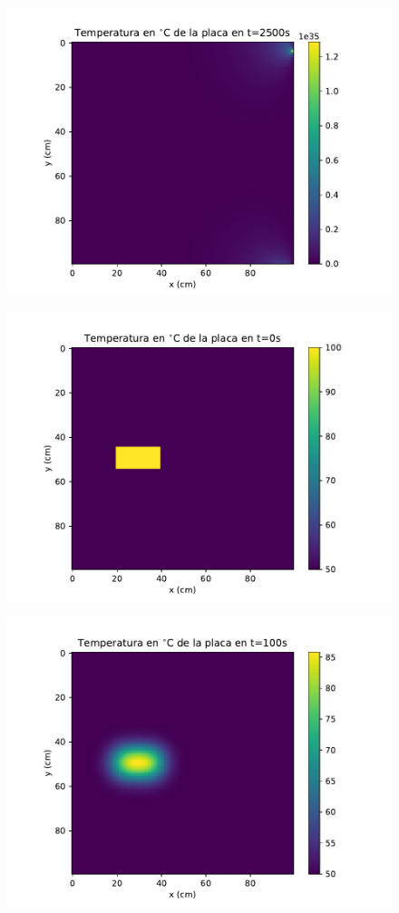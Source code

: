 \documentclass[12pt,letterpaper]{article}
\begin{document}
\begin{figure}[ht]
\includegraphics{a2_2500.pdf}
\centering
\end{figure}

\begin{figure}[ht]
\includegraphics{p1_0.pdf}
\centering
\end{figure}

\begin{figure}[ht]
\includegraphics{p1_100.pdf}
\centering
\end{figure}
\end{document}

